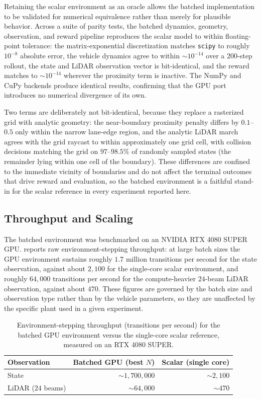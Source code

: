 Retaining the scalar environment as an oracle allows the batched implementation to be validated for numerical equivalence rather than merely for plausible behavior. Across a suite of parity tests, the batched dynamics, geometry, observation, and reward pipeline reproduces the scalar model to within floating-point tolerance: the matrix-exponential discretization matches \texttt{scipy} to roughly $10^{-8}$ absolute error, the vehicle dynamics agree to within $\sim\!10^{-14}$ over a $200$-step rollout, the state and LiDAR observation vector is bit-identical, and the reward matches to $\sim\!10^{-14}$ wherever the proximity term is inactive. The NumPy and CuPy backends produce identical results, confirming that the GPU port introduces no numerical divergence of its own.

Two terms are deliberately not bit-identical, because they replace a rasterized grid with analytic geometry: the near-boundary proximity penalty differs by $0.1$--$0.5$ only within the narrow lane-edge region, and the analytic LiDAR march agrees with the grid raycast to within approximately one grid cell, with collision decisions matching the grid on $97$--$98.5\%$ of randomly sampled states (the remainder lying within one cell of the boundary). These differences are confined to the immediate vicinity of boundaries and do not affect the terminal outcomes that drive reward and evaluation, so the batched environment is a faithful stand-in for the scalar reference in every experiment reported here.

\subsection{Throughput and Scaling}

The batched environment was benchmarked on an NVIDIA RTX 4080 SUPER GPU.  reports raw environment-stepping throughput: at large batch sizes the GPU environment sustains roughly $1.7$ million transitions per second for the state observation, against about $2{,}100$ for the single-core scalar environment, and roughly $64{,}000$ transitions per second for the compute-heavier $24$-beam LiDAR observation, against about $470$. These figures are governed by the batch size and observation type rather than by the vehicle parameters, so they are unaffected by the specific plant used in a given experiment.

\begin{table}[H]
\centering
\caption{Environment-stepping throughput (transitions per second) for the batched GPU environment versus the single-core scalar reference, measured on an RTX 4080 SUPER.}
\label{tab:sim_throughput}
\begin{tabular}{lrr}
\toprule
Observation & Batched GPU (best $N$) & Scalar (single core) \\
\midrule
State & $\sim\!1{,}700{,}000$ & $\sim\!2{,}100$ \\
LiDAR ($24$ beams) & $\sim\!64{,}000$ & $\sim\!470$ \\
\bottomrule
\end{tabular}
\end{table}

